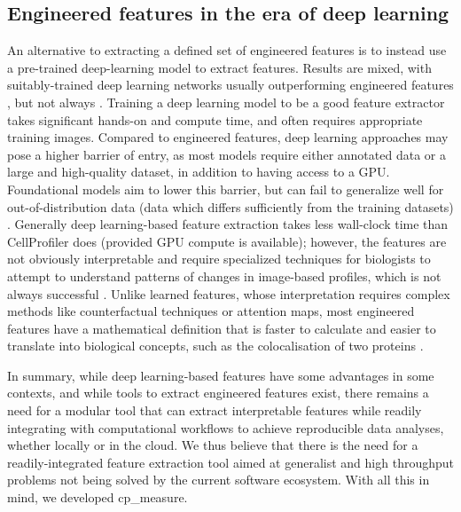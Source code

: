 \documentclass{article}
\begin{document}
\subsection{Engineered features in the era of deep learning}
\label{sec:org9dc3dfa}
An alternative to extracting a defined set of engineered features is to instead use a pre-trained deep-learning model to extract features. Results are mixed, with suitably-trained deep learning networks usually outperforming engineered features \cite{lafargeCapturingSingleCellPhenotypic2019,moshkovLearningRepresentationsImagebased2022,chowPredictingDrugPolypharmacology2022,wolfSCANPYLargescaleSinglecell2018}, but not always \cite{tangMorphologicalProfilingDrug2024,kimSelfsupervisionAdvancesMorphological2023}. Training a deep learning model to be a good feature extractor takes significant hands-on and compute time, and often requires appropriate training images. Compared to engineered features, deep learning approaches may pose a higher barrier of entry, as most models require either annotated data or a large and high-quality dataset, in addition to having access to a GPU. Foundational models aim to lower this barrier, but can fail to generalize well for out-of-distribution data (data which differs sufficiently from the training datasets) \cite{azadFoundationalModelsMedical2023}. Generally deep learning-based feature extraction takes less wall-clock time than CellProfiler does (provided GPU compute is available); however, the features are not obviously interpretable and require specialized techniques for biologists to attempt to understand patterns of changes in image-based profiles, which is not always successful \citep{liChallengesOpportunitiesBioimage2023}.  Unlike learned features, whose interpretation requires complex methods like counterfactual techniques or attention maps, most engineered features have a mathematical definition that is faster to calculate and easier to translate into biological concepts, such as the colocalisation of two proteins \cite{garcia-fossaInterpretingImagebasedProfiles2023}.

In summary, while deep learning-based features have some advantages in some contexts, and while tools to extract engineered features exist, there remains a need for a modular tool that can extract interpretable features while readily integrating with computational workflows to achieve reproducible data analyses, whether locally or in the cloud. We thus believe that there is the need for a readily-integrated feature extraction tool aimed at generalist and high throughput problems not being solved by the current software ecosystem. With all this in mind, we developed cp\_measure.
\end{document}
